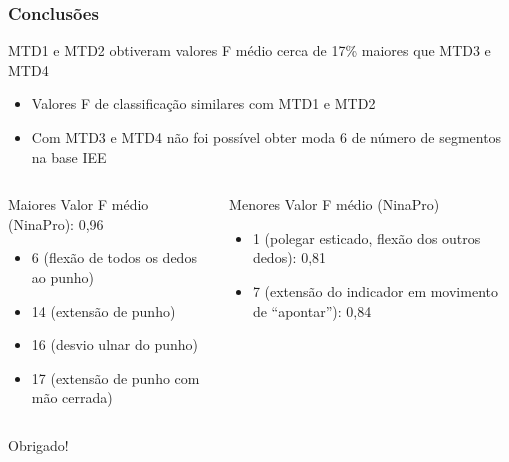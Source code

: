\documentclass{beamer}
\begin{document}
	\begin{frame}
		\frametitle{Conclusões}
		
		\begin{block}{MTD1 e MTD2 obtiveram valores F médio cerca de 17\% maiores que MTD3 e MTD4}
			\begin{itemize}
				\item Valores F de classificação similares com MTD1 e MTD2
				\item Com MTD3 e MTD4 não foi possível obter moda 6 de número de segmentos na base IEE
			\end{itemize}
		\end{block}
		
		\begin{columns}[c]
		
		\begin{exampleblock}{Maiores Valor F médio (NinaPro): 0,96}
			\begin{itemize}
				\item 6 (flexão de todos os dedos ao punho)
				\item 14 (extensão de punho)
				\item 16 (desvio ulnar do punho)
				\item 17 (extensão de punho com mão cerrada)
			\end{itemize}
		\end{exampleblock}
		
		\begin{alertblock}{Menores Valor F médio (NinaPro)}
			\begin{itemize}
				\item 1 (polegar esticado, flexão dos outros dedos): 0,81
				\item 7 (extensão do indicador em movimento de ``apontar''): 0,84
			\end{itemize}
		\end{alertblock}
		
		\end{columns}
	\end{frame}
		
	\begin{frame}
		Obrigado!
	\end{frame}
\end{document}
